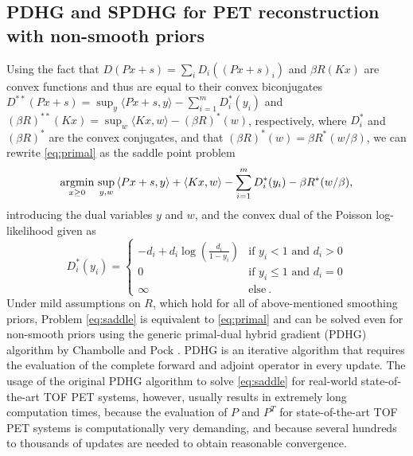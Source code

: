 \subsection*{PDHG and SPDHG for PET reconstruction with non-smooth priors}

Using the fact that $D(Px + s) = \sum_i D_i((Px + s)_i)$ and $\beta R(Kx)$ are convex functions and thus are
equal to their convex biconjugates 
$D^{**}(Px + s) = \sup_y \langle Px + s, y \rangle - \sum_{i=1}^{m} D_i^*(y_i)$ 
and $(\beta R)^{**}(Kx) = \sup_w \langle Kx, w \rangle - (\beta R)^*(w)$, respectively, 
where $D_i^*$ and $(\beta R)^*$ are the convex conjugates,
and that $(\beta R)^*(w) = \beta R^*(w / \beta)$, 
we can rewrite \eqref{eq:primal} as the saddle point problem
%
\begin{equation}
\operatorname*{argmin}_{x\geq 0} \, \sup_{y,w} \,  \langle Px + s, y \rangle + \langle Kx, w \rangle - \sum_{i=1}^{m} D_i^*(y_i) - \beta R^*(w/\beta) ,
\label{eq:saddle}
\end{equation}
%
introducing the dual variables $y$ and $w$, and the convex dual of the Poisson log-likelihood given as
%
\begin{equation}
D_i^*(y_i) =
\begin{cases}
-d_i + d_i \log \left( \frac{d_i}{1-y_i} \right) & \text{if } y_i < 1 \text{ and } d_i > 0 \\
0 & \text{if } y_i \leq 1 \text{ and } d_i = 0 \\
\infty & \text{else} \ .
\end{cases}
\end{equation}
%
Under mild assumptions on $R$, which hold for all of above-mentioned smoothing priors, Problem \eqref{eq:saddle} is equivalent to \eqref{eq:primal} and
can be solved even for non-smooth priors using the generic primal-dual hybrid gradient (PDHG) 
algorithm by Chambolle and Pock \cite{Chambolle2011}.
PDHG is an iterative algorithm that requires the evaluation of the complete forward and adjoint operator
in every update.
The usage of the original PDHG algorithm to solve \eqref{eq:saddle} for real-world state-of-the-art
TOF PET systems, however, usually results in extremely long computation times, 
because the evaluation of $P$ and $P^T$
for state-of-the-art TOF PET systems is computationally very demanding, and 
because several hundreds to thousands of updates are needed to obtain reasonable convergence.

